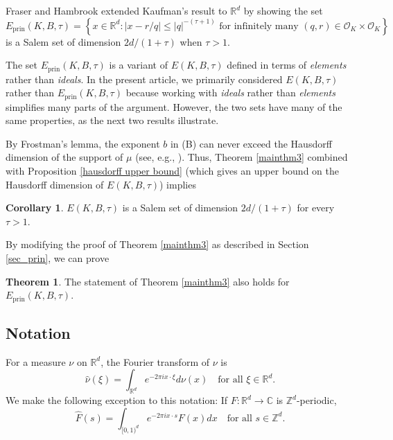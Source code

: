 \documentclass{amsart}
\numberwithin{equation}{section}
\theoremstyle{definition}
\newtheorem{thm}[theorem]{Theorem}
\newtheorem{corollary}[theorem]{Corollary}
\theoremstyle{definition}
\def\RR{\mathbb{R}}
\def\CC{\mathbb{C}}
\def\ZZ{\mathbb{Z}}
\newcommand{\cbr}[1]{ \left\{ {#1} \right\} }
\newcommand{\OK}{\mathcal{O}_K}
\newcommand{\prin}{\mathrm{prin}}
\begin{document}
Fraser and Hambrook \cite{hambrook-fraser-Rn}  
extended Kaufman's result to $\RR^d$ 
by showing the set 
$$
E_{\prin}(K,B,\tau)=
\cbr{x \in \RR^d : |x-r/q| \leq |q|^{-(\tau+1)} \text{ for infinitely many } (q,r) \in \OK \times \OK}
$$
is a Salem set of dimension $2d/(1+\tau)$ when $\tau > 1$. 


The set $E_{\prin}(K,B,\tau)$ is a variant of $E(K,B,\tau)$ defined in terms of \textit{elements} rather than \textit{ideals}. 
In the present article, we primarily considered $E(K, B, \tau)$ rather than $E_{\prin}(K, B, \tau)$ because working with \textit{ideals} rather than \textit{elements} simplifies many parts of the argument. However, the two sets have many of the same properties, as the next two results illustrate. 

By Frostman's lemma, the exponent $b$ in (B) can never exceed the Hausdorff dimension of the support of $\mu$ (see, e.g.,  \cite[Section 3.6]{mattila-book-2}). 
Thus, Theorem \ref{mainthm3} combined with Proposition \ref{hausdorff upper bound} (which gives an upper bound on the Hausdorff dimension of $E(K,B,\tau)$)
implies 


\begin{corollary}\label{Salem_cor}
$E(K,B,\tau)$ is a Salem set of dimension $2d/(1+\tau)$ for every $\tau > 1$.
\end{corollary}













By modifying the proof of Theorem \ref{mainthm3} as described in Section \ref{sec_prin}, we can prove 

%
\begin{thm}\label{Eprinthm}
The statement of Theorem \ref{mainthm3} also holds for $E_{\prin}(K, B, \tau)$.
\end{thm}








\subsection{Notation}\label{notation}
For a measure $\nu$ on $\RR^d$, the Fourier transform of $\nu$ is   $$\widehat{\nu}(\xi)=\int_{\RR^d} e^{-2\pi i x \cdot \xi } d\nu(x) \quad \text{for all $\xi \in \RR^d$}.$$
We make the following exception to 
this notation: If $F:\RR^d \to \CC$ is $\ZZ^d$-periodic, 
$$
\widehat{F}(s)  
=\int_{[0,1)^d} e^{-2\pi i x \cdot s } F(x) dx \quad \text{for all $s \in \ZZ^d$}.$$
\end{document}
